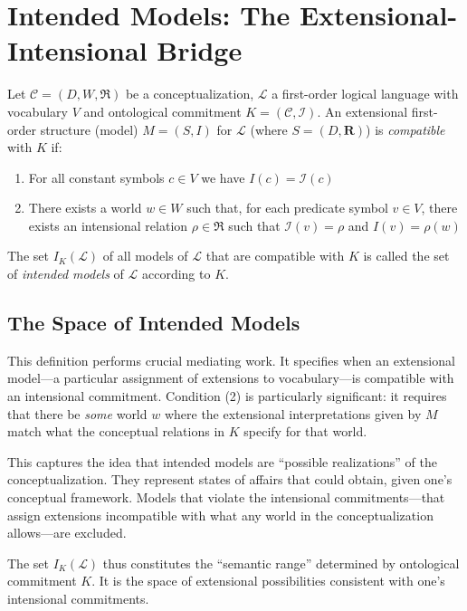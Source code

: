 \section{Intended Models: The Extensional-Intensional Bridge}

\begin{definition}
	Let $\mathcal{C} = (D, W, \mathfrak{R})$ be a conceptualization, $\mathcal{L}$ a first-order logical language with vocabulary $V$ and ontological commitment $K = (\mathcal{C}, \mathcal{I})$. An extensional first-order structure (model) $M = (S, I)$ for $\mathcal{L}$ (where $S = (D, \mathbf{R})$) is \emph{compatible} with $K$ if:
	\begin{enumerate}
		\item For all constant symbols $c \in V$ we have $I(c) = \mathcal{I}(c)$
		\item There exists a world $w \in W$ such that, for each predicate symbol $v \in V$, there exists an intensional relation $\rho \in \mathfrak{R}$ such that $\mathcal{I}(v) = \rho$ and $I(v) = \rho(w)$
	\end{enumerate}
	The set $I_K(\mathcal{L})$ of all models of $\mathcal{L}$ that are compatible with $K$ is called the set of \emph{intended models} of $\mathcal{L}$ according to $K$.
\end{definition}

\subsection{The Space of Intended Models}

This definition performs crucial mediating work. It specifies when an extensional model—a particular assignment of extensions to vocabulary—is compatible with an intensional commitment. Condition (2) is particularly significant: it requires that there be \emph{some} world $w$ where the extensional interpretations given by $M$ match what the conceptual relations in $K$ specify for that world.

This captures the idea that intended models are ``possible realizations'' of the conceptualization. They represent states of affairs that could obtain, given one's conceptual framework. Models that violate the intensional commitments—that assign extensions incompatible with what any world in the conceptualization allows—are excluded.

The set $I_K(\mathcal{L})$ thus constitutes the ``semantic range'' determined by ontological commitment $K$. It is the space of extensional possibilities consistent with one's intensional commitments.

